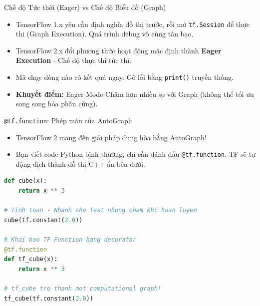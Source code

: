 \documentclass[aspectratio=169]{beamer}
\begin{document}
\begin{frame}{Chế độ Tức thời (Eager) vs Chế độ Biểu đồ (Graph)}
    \begin{itemize}
        \item TensorFlow 1.x yêu cầu định nghĩa đồ thị trước, rồi mở \texttt{tf.Session} để thực thi (Graph Execution). Quá trình debug vô cùng tàn bạo.
        \item TensorFlow 2.x đổi phương thức hoạt động mặc định thành \textbf{Eager Execution} - Chế độ thực thi tức thì.
        \item Mã chạy dòng nào có kết quả ngay. Gỡ lỗi bằng \texttt{print()} truyền thống.
        \item \textbf{Khuyết điểm:} Eager Mode Chậm hơn nhiều so với Graph (không thể tối ưu song song hóa phần cứng).
    \end{itemize}
\end{frame}

\begin{frame}[fragile]{\texttt{@tf.function}: Phép màu của AutoGraph}
    \begin{itemize}
        \item TensorFlow 2 mang đến giải pháp dung hòa bằng AutoGraph!
        \item Bạn viết code Python bình thường, chỉ cần đánh dấu \texttt{@tf.function}. TF sẽ tự động dịch thành đồ thị C++ ẩn bên dưới.
    \end{itemize}
    \begin{lstlisting}[language=Python]
def cube(x):
    return x ** 3

# Tinh toan - Nhanh cho Test nhung cham khi huan luyen
cube(tf.constant(2.0))

# Khai bao TF Function bang decorator
@tf.function
def tf_cube(x):
    return x ** 3

# tf_cube tro thanh mot computational graph!
tf_cube(tf.constant(2.0)) 
    \end{lstlisting}
\end{frame}
\end{document}
